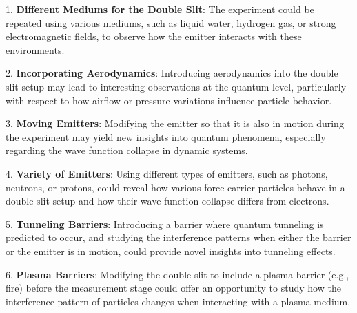 \documentclass{article}
\begin{document}
1. \textbf{Different Mediums for the Double Slit}: The experiment could be repeated using various mediums, such as liquid water, hydrogen gas, or strong electromagnetic fields, to observe how the emitter interacts with these environments. 

2. \textbf{Incorporating Aerodynamics}: Introducing aerodynamics into the double slit setup may lead to interesting observations at the quantum level, particularly with respect to how airflow or pressure variations influence particle behavior.

3. \textbf{Moving Emitters}: Modifying the emitter so that it is also in motion during the experiment may yield new insights into quantum phenomena, especially regarding the wave function collapse in dynamic systems.

4. \textbf{Variety of Emitters}: Using different types of emitters, such as photons, neutrons, or protons, could reveal how various force carrier particles behave in a double-slit setup and how their wave function collapse differs from electrons.

5. \textbf{Tunneling Barriers}: Introducing a barrier where quantum tunneling is predicted to occur, and studying the interference patterns when either the barrier or the emitter is in motion, could provide novel insights into tunneling effects.

6. \textbf{Plasma Barriers}: Modifying the double slit to include a plasma barrier (e.g., fire) before the measurement stage could offer an opportunity to study how the interference pattern of particles changes when interacting with a plasma medium.


\printbibliography
\end{document}
